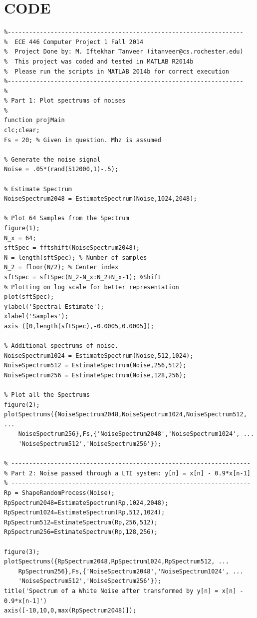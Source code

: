 \documentclass[12pt]{article}
\begin{document}
\section{CODE}
    \begin{verbatim}
%------------------------------------------------------------------
%  ECE 446 Computer Project 1 Fall 2014
%  Project Done by: M. Iftekhar Tanveer (itanveer@cs.rochester.edu)
%  This project was coded and tested in MATLAB R2014b
%  Please run the scripts in MATLAB 2014b for correct execution
%------------------------------------------------------------------
%
% Part 1: Plot spectrums of noises
%
function projMain
clc;clear;
Fs = 20; % Given in question. Mhz is assumed

% Generate the noise signal
Noise = .05*(rand(512000,1)-.5);

% Estimate Spectrum
NoiseSpectrum2048 = EstimateSpectrum(Noise,1024,2048);

% Plot 64 Samples from the Spectrum
figure(1);
N_x = 64;
sftSpec = fftshift(NoiseSpectrum2048);
N = length(sftSpec); % Number of samples
N_2 = floor(N/2); % Center index
sftSpec = sftSpec(N_2-N_x:N_2+N_x-1); %Shift
% Plotting on log scale for better representation
plot(sftSpec);
ylabel('Spectral Estimate');
xlabel('Samples');
axis ([0,length(sftSpec),-0.0005,0.0005]);

% Additional spectrums of noise.
NoiseSpectrum1024 = EstimateSpectrum(Noise,512,1024);
NoiseSpectrum512 = EstimateSpectrum(Noise,256,512);
NoiseSpectrum256 = EstimateSpectrum(Noise,128,256);

% Plot all the Spectrums
figure(2);
plotSpectrums({NoiseSpectrum2048,NoiseSpectrum1024,NoiseSpectrum512, ...
    NoiseSpectrum256},Fs,{'NoiseSpectrum2048','NoiseSpectrum1024', ...
    'NoiseSpectrum512','NoiseSpectrum256'});

% -------------------------------------------------------------------
% Part 2: Noise passed through a LTI system: y[n] = x[n] - 0.9*x[n-1]
% -------------------------------------------------------------------
Rp = ShapeRandomProcess(Noise);
RpSpectrum2048=EstimateSpectrum(Rp,1024,2048);
RpSpectrum1024=EstimateSpectrum(Rp,512,1024);
RpSpectrum512=EstimateSpectrum(Rp,256,512);
RpSpectrum256=EstimateSpectrum(Rp,128,256);

figure(3);
plotSpectrums({RpSpectrum2048,RpSpectrum1024,RpSpectrum512, ...
    RpSpectrum256},Fs,{'NoiseSpectrum2048','NoiseSpectrum1024', ...
    'NoiseSpectrum512','NoiseSpectrum256'});
title('Spectrum of a White Noise after transformed by y[n] = x[n] - 0.9*x[n-1]')
axis([-10,10,0,max(RpSpectrum2048)]);


\end{verbatim}
\end{document}
